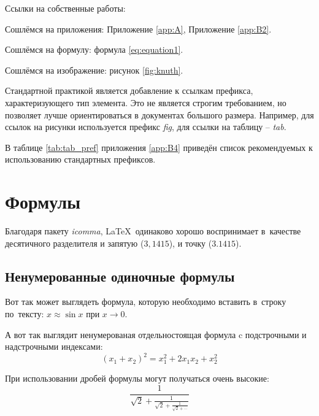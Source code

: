 %

Ссылки на собственные работы:~\cite{vakbib1, confbib1}

Сошлёмся на приложения: Приложение \ref{app:A}, Приложение \ref{app:B2}.

Сошлёмся на формулу: формула \eqref{eq:equation1}.

Сошлёмся на изображение: рисунок \ref{fig:knuth}.

Стандартной практикой является добавление к ссылкам префикса, характеризующего тип элемента.
Это не является строгим требованием, но позволяет лучше ориентироваться в документах большого размера.
Например, для ссылок на рисунки используется префикс \textit{fig},
для ссылки на таблицу -- \textit{tab}.

В таблице \ref{tab:tab_pref} приложения \ref{app:B4} приведён список рекомендуемых
к использованию стандартных префиксов.

\section{Формулы} \label{sec:ch1/sec0}

Благодаря пакету \textit{icomma}, \LaTeX~одинаково хорошо воспринимает
в~качестве десятичного разделителя и запятую ($3,1415$), и точку ($3.1415$).

\subsection{Ненумерованные одиночные формулы} \label{subsec:ch1/sec3/sub1}

Вот так может выглядеть формула, которую необходимо вставить в~строку
по~тексту: $x \approx \sin x$ при $x \to 0$.

А вот так выглядит ненумерованая отдельностоящая формула c подстрочными
и надстрочными индексами:
\[
(x_1+x_2)^2 = x_1^2 + 2 x_1 x_2 + x_2^2
\]

При использовании дробей формулы могут получаться очень высокие:
\[
  \frac{1}{\sqrt{2}+
  \displaystyle\frac{1}{\sqrt{2}+
  \displaystyle\frac{1}{\sqrt{2}+\cdots}}}
\]

